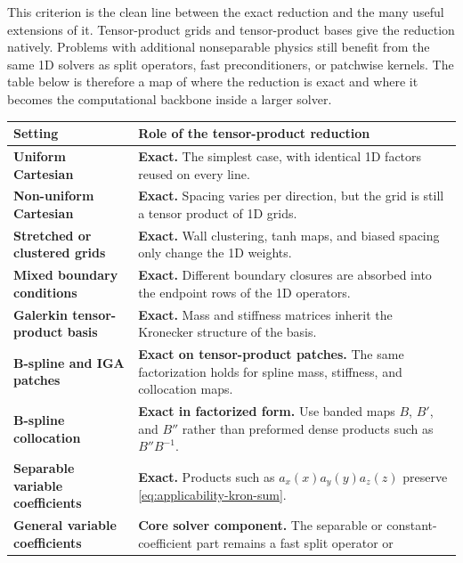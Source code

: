 \documentclass[11pt]{article}
\begin{document}
This criterion is the clean line between the exact reduction and the
many useful extensions of it.  Tensor-product grids and tensor-product
bases give the reduction natively.  Problems with additional
nonseparable physics still benefit from the same 1D solvers as split
operators, fast preconditioners, or patchwise kernels.  The table below
is therefore a map of where the reduction is exact and where it becomes
the computational backbone inside a larger solver.

\medskip
\footnotesize
\renewcommand{\arraystretch}{1.24}
\begin{tabular}{@{}>{\raggedright\arraybackslash}p{}>{\raggedright\arraybackslash}p{}@{}}
\toprule
\textbf{Setting} & \textbf{Role of the tensor-product reduction} \\
\midrule
\textbf{Uniform Cartesian} & \textbf{Exact.} The simplest case, with identical 1D
  factors reused on every line. \\
\addlinespace[5pt]
\textbf{Non-uniform Cartesian} & \textbf{Exact.} Spacing varies per direction, but the grid
  is still a tensor product of 1D grids. \\
\addlinespace[5pt]
\textbf{Stretched or clustered grids} & \textbf{Exact.} Wall clustering, tanh maps, and
  biased spacing only change the 1D weights. \\
\addlinespace[5pt]
\textbf{Mixed boundary conditions} & \textbf{Exact.} Different boundary closures are
  absorbed into the endpoint rows of the 1D operators. \\
\addlinespace[5pt]
\textbf{Galerkin tensor-product basis} & \textbf{Exact.} Mass and stiffness matrices inherit
  the Kronecker structure of the basis. \\
\addlinespace[5pt]
\textbf{B-spline and IGA patches} & \textbf{Exact on tensor-product patches.} The same
  factorization holds for spline mass, stiffness, and collocation maps. \\
\addlinespace[5pt]
\textbf{B-spline collocation} & \textbf{Exact in factorized form.} Use banded maps $B$,
  $B'$, and $B''$ rather than preformed dense products such as
  $B''B^{-1}$. \\
\addlinespace[5pt]
\textbf{Separable variable coefficients} & \textbf{Exact.} Products such as
  $a_x(x)a_y(y)a_z(z)$ preserve \eqref{eq:applicability-kron-sum}. \\
\addlinespace[5pt]
\textbf{General variable coefficients} & \textbf{Core solver component.} The separable or
  constant-coefficient part remains a fast split operator or

\end{tabular}
\end{document}
